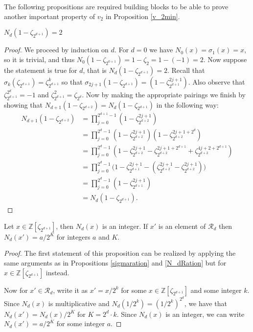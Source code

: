 \documentclass[12pt]{dalthesis}
\begin{document}
The following propositions are required building blocks to be able to prove another important property of $v_2$ in Proposition \ref{v_2min}.

\begin{proposition}
\label{N_d=2}
$N_d(1- \zeta_{2^{d+1}}) = 2$
\end{proposition}
\begin{proof}
We proceed by induction on $d$. For $d=0$ we have $N_0(x) = \sigma_1(x) = x$, so it is trivial, and thus $N_0(1-\zeta_{2^{0+1}}) = 1- \zeta_{2} = 1 - (-1) = 2$. Now suppose the statement is true for $d$, that is $N_d (1- \zeta_{2^{d+1}}) = 2$. Recall that $\sigma_k (\zeta_{2^{d+1}}) = \zeta_{2^{d+1}}^k$ so that $\sigma_{2j+1}(1-\zeta_{2^{d+1}}) = (1-\zeta_{2^{d+1}}^{2j+1})$. Also observe that $\zeta_{2^{d+1}}^{2^d} = -1$ and $\zeta_{2^{d+1}}^{2} = \zeta_{2^d}$. Now by making the appropriate pairings we finish by showing that $N_{d+1}(1-\zeta_{2^{d+2}}) = N_{d}(1-\zeta_{2^{d+1}})$ in the following way:
\begin{equation*}
\begin{split}
N_{d+1}(1-\zeta_{2^{d+2}}) & = \prod_{j=0}^{2^{d+1}-1} (1-\zeta_{2^{d+2}}^{2j+1}) \\
& = \prod_{j=0}^{2^{d}-1} (1-\zeta_{2^{d+2}}^{2j+1})(1-\zeta_{2^{d+2}}^{2j+1 +2^{d}}) \\
& = \prod_{j=0}^{2^{d}-1} (1-\zeta_{2^{d+2}}^{2j+1} - \zeta_{2^{d+2}}^{2j+1 + 2^{d+1}} + \zeta_{2^{d+2}}^{4j+2+2^{d+1}}) \\
& = \prod_{j=0}^{2^{d}-1} \big( 1-\zeta_{2^{d+1}}^{2j+1} - (\zeta_{2^{d+2}}^{2j+1} - \zeta_{2^{d+2}}^{2j+1}) \big) \\
& = \prod_{j=0}^{2^{d}-1} (1-\zeta_{2^{d+1}}^{2j+1}) \\
& = N_d(1-\zeta_{2^{d+1}}). 
\end{split}
\end{equation*}
\end{proof}

\begin{proposition}
\label{N_dint}
Let $x \in \mathbb{Z}[\zeta_{2^{d+1}}]$, then $N_d(x)$ is an integer. If $x'$ is an element of $\mathcal{R}_d$ then $N_d(x') = a/2^K$ for integers $a$ and $K$.
\end{proposition}
\begin{proof}
The first statement of this proposition can be realized by applying the same arguments as in Propositions \ref{sigmaration} and \ref{N_dRation} but for $x \in \mathbb{Z}[\zeta_{2^{d+1}}]$ instead.

Now for $x' \in \mathcal{R}_d$, write it as $x' = x/2^k$ for some $x \in \mathbb{Z}[\zeta_{2^{d+1}}]$ and some integer $k$. Since $N_d(x)$ is multiplicative and $N_d(1/2^k) = (1/2^k)^{2^d}$, we have that $N_d(x') = N_d(x)/2^K$ for $K = 2^d\cdot k$. Since $N_d(x)$ is an integer, we can write $N_d(x') = a/2^K$ for some integer $a$.
\end{proof}
\end{document}
